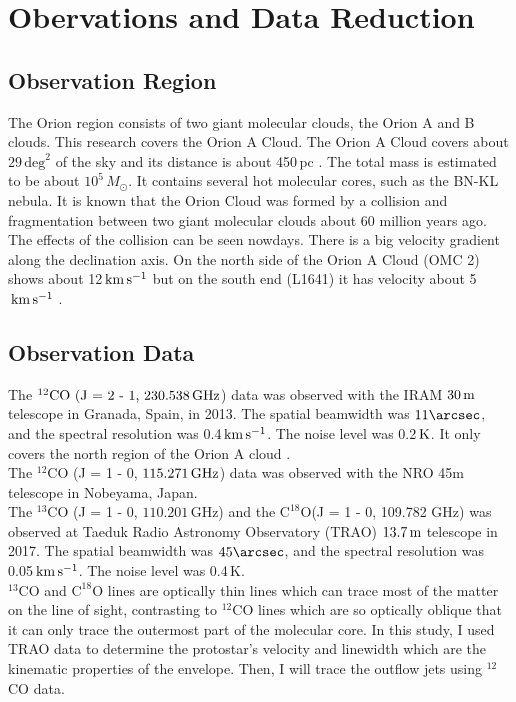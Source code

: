 \section{Obervations and Data Reduction}

\subsection{Observation Region}
The Orion region consists of two giant molecular clouds, the Orion A and B clouds. This research covers the Orion A Cloud. The Orion A Cloud covers about $29 \, \textrm{deg}^2$ of the sky and its distance is about 450$\,$pc \cite{kounkel2017gould}. The total mass is estimated to be about $10^5 \, M_{\odot}$. It contains several hot molecular cores, such as the BN-KL nebula. It is known that the Orion Cloud was formed by a collision and fragmentation between two giant molecular clouds about 60 million years ago. The effects of the collision can be seen nowdays. There is a big velocity gradient along the declination axis. On the north side of the Orion A Cloud (OMC 2) shows about 12$\, \rm km\,s^{-1}$ but on the south end (L1641) it has velocity about 5$\, \rm km\,s^{-1}$ \cite{schulz2012formation}.

\subsection{Observation Data}
The $^{12}\textrm{CO (J = 2 - 1, 230.538\,GHz}$) data was observed with the IRAM $\textrm{30\,m}$ telescope in Granada, Spain, in 2013. The spatial beamwidth was $11\arcsec$, and the spectral resolution was 0.4$\, \rm km\,s^{-1}$. The noise level was 0.2$\, \rm K$. It only covers the north region of the Orion A cloud \cite{berne2014iram}. \\
The $^{12}$CO (J = 1 - 0, $115.271\, \rm GHz$) data was observed with the NRO 45m telescope in Nobeyama, Japan.  \\
The $^{13}$CO (J = 1 - 0, $110.201\,$GHz) and the $\textrm{C}^{18}\textrm{O}$(J = 1 - 0, 109.782 GHz) was observed at Taeduk Radio Astronomy Observatory (TRAO)  $\textrm{13.7\,m}$ telescope in 2017. The spatial beamwidth was $45\arcsec$, and the spectral resolution was 0.05$\, \rm km\,s^{-1}$. The noise level was 0.4$\,$K.\\
$^{13}$CO and $\textrm{C}^{18}\textrm{O}$ lines are optically thin lines which can trace most of the matter on the line of sight, contrasting to $^{12}$CO lines which are so optically oblique that it can only trace the outermost part of the molecular core. In this study, I used TRAO data to determine the protostar's velocity and linewidth which are the kinematic properties of the envelope. Then, I will trace the outflow jets using $^{12}$CO data.

